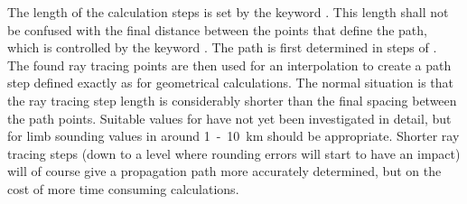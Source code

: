 The length of the calculation steps is set by the keyword
. This length shall not be confused with the
final distance between the points that define the path, which is
controlled by the keyword . The path is first
determined in steps of . The found ray tracing
points are then used for an interpolation to create a path step
defined exactly as for geometrical calculations. The normal situation
is that the ray tracing step length is considerably shorter than the
final spacing between the path points. Suitable values for
 have not yet been investigated in detail, but
for limb sounding values in around 1~-~10~km should be appropriate.
Shorter ray tracing steps (down to a level where rounding errors will
start to have an impact) will of course give a propagation path more
accurately determined, but on the cost of more time consuming
calculations.


